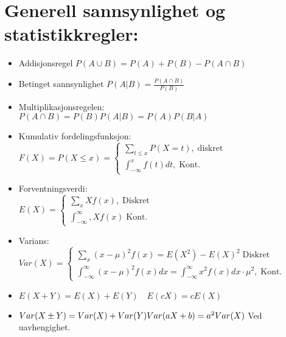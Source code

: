 \documentclass[12pt,a4paper,twocolumn,twoside]{article}
\begin{document}
\section*{Generell sannsynlighet og statistikkregler:}
\begin{itemize}[topsep=0pt,itemsep=0pt, partopsep=0pt]
    \item Addisjonsregel $P(A\cup B)=P(A)+P(B)-P(A\cap B)$
    \item Betinget sannsynlighet $P(A|B)=\frac{P(A\cap B)}{P(B)}$
    \item Multiplikasjonsregelen:\\$P(A\cap B)=P(B)P(A|B)=P(A)P(B|A)$
    \item Kumulativ fordelingsfunksjon: $F(X)=P(X\leq x)=\begin{cases}
        \sum_{t\leq x} P(X=t),\;\text{diskret}\\
        \int_{-\infty}^x f(t)dt,\;\text{Kont.}
    \end{cases}$
    \item Forventningsverdi:\\$E(X)=\begin{cases}
        \sum_x Xf(x),\;\text{Diskret}\\
        \int_{-\infty}^\infty,Xf(x)\;\text{Kont.}
    \end{cases}$
    \item Varians:\\$Var(X)=\begin{cases}
        \sum_x(x-\mu)^2f(x)=E(X^2)-E(X)^2\;\text{Diskret}\\
        \int_{-\infty}^\infty (x-\mu)^2f(x)dx = \int_{-\infty}^{\infty}x^2f(x)dx\cdot\mu^2,\;\text{Kont.}
    \end{cases}$
    \item $E(X+Y) = E(X)+E(Y)\quad E(cX)=cE(X)$
    \item $Var(X\pm Y) = Var(X)+Var(Y)\\ Var(aX+b)=a^2Var(X)$ Ved uavhengighet.
\end{itemize}
%
%
\end{document}
